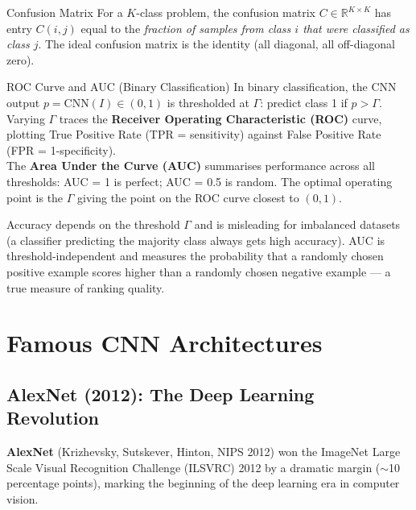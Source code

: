\documentclass[11pt,a4paper]{article}
\newcommand{\term}[1]{\textcolor{DefGreen}{\textbf{#1}}}
\begin{document}
\begin{defbox}{Confusion Matrix}
For a $K$-class problem, the confusion matrix $C \in \mathbb{R}^{K\times K}$ has entry $C(i,j)$ equal to the \emph{fraction of samples from class $i$ that were classified as class $j$}. The ideal confusion matrix is the identity (all diagonal, all off-diagonal zero).
\end{defbox}

\begin{defbox}{ROC Curve and AUC (Binary Classification)}
In binary classification, the CNN output $p = \mathrm{CNN}(I) \in (0,1)$ is thresholded at $\Gamma$: predict class 1 if $p > \Gamma$. Varying $\Gamma$ traces the \term{Receiver Operating Characteristic (ROC)} curve, plotting True Positive Rate (TPR = sensitivity) against False Positive Rate (FPR = 1-specificity).\\
The \textbf{Area Under the Curve (AUC)} summarises performance across all thresholds: AUC = 1 is perfect; AUC = 0.5 is random. The optimal operating point is the $\Gamma$ giving the point on the ROC curve closest to $(0,1)$.
\end{defbox}

\begin{insightbox}
Accuracy depends on the threshold $\Gamma$ and is misleading for imbalanced datasets (a classifier predicting the majority class always gets high accuracy). AUC is threshold-independent and measures the probability that a randomly chosen positive example scores higher than a randomly chosen negative example — a true measure of ranking quality.
\end{insightbox}

\section{Famous CNN Architectures}
\label{sec:famous_archs}

\subsection{AlexNet (2012): The Deep Learning Revolution}

\term{AlexNet} (Krizhevsky, Sutskever, Hinton, NIPS 2012) won the ImageNet Large Scale Visual Recognition Challenge (ILSVRC) 2012 by a dramatic margin ($\sim$10 percentage points), marking the beginning of the deep learning era in computer vision.
\end{document}
